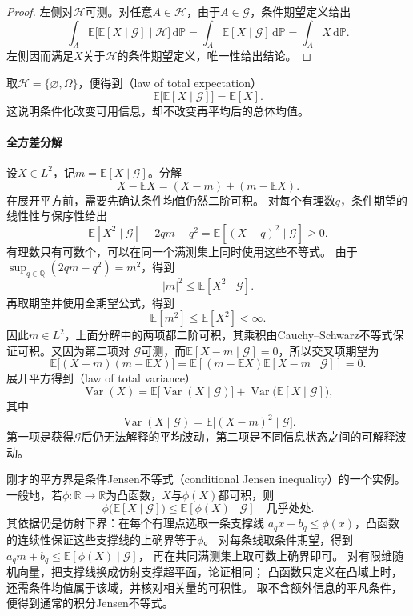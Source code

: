 \begin{proof}
左侧对\(\mathcal{H}\)可测。对任意\(A\in\mathcal{H}\)，由于\(A\in\mathcal{G}\)，条件期望定义给出
\[
  \int_A
  \mathbb{E}\bigl[\mathbb{E}[X\mid\mathcal{G}]
  \mid\mathcal{H}\bigr]\,\mathrm{d}\mathbb{P}
  =
  \int_A\mathbb{E}[X\mid\mathcal{G}]\,\mathrm{d}\mathbb{P}
  =
  \int_A X\,\mathrm{d}\mathbb{P}.
\]
左侧因而满足\(X\)关于\(\mathcal{H}\)的条件期望定义，唯一性给出结论。
\end{proof}

取\(\mathcal{H}=\{\varnothing,\Omega\}\)，便得到（law of total expectation）
\begin{equation}
  \mathbb{E}\bigl[\mathbb{E}[X\mid\mathcal{G}]\bigr]
  =
  \mathbb{E}[X].
  \label{eq:probability-total-expectation}
\end{equation}
这说明条件化改变可用信息，却不改变再平均后的总体均值。

\paragraph{全方差分解}
设\(X\in L^2\)，记\(m=\mathbb{E}[X\mid\mathcal{G}]\)。分解
\[ X-\mathbb{E}X=(X-m)+(m-\mathbb{E}X). \]
在展开平方前，需要先确认条件均值仍然二阶可积。
对每个有理数\(q\)，条件期望的线性性与保序性给出
\[
 \mathbb E[X^2\mid\mathcal G]-2qm+q^2
 =\mathbb E[(X-q)^2\mid\mathcal G]\geq0.
\]
有理数只有可数个，可以在同一个满测集上同时使用这些不等式。
由于\(\sup_{q\in\mathbb Q}(2qm-q^2)=m^2\)，得到
\[
  |m|^2
  \leq
  \mathbb{E}[X^2\mid\mathcal{G}].
\]
再取期望并使用全期望公式，得到
\[
  \mathbb{E}[m^2]\leq\mathbb{E}[X^2]<\infty.
\]
因此\(m\in L^2\)，上面分解中的两项都二阶可积，其乘积由Cauchy--Schwarz不等式保证可积。又因为第二项对
\(\mathcal{G}\)可测，而\(\mathbb{E}[X-m\mid\mathcal{G}]=0\)，所以交叉项期望为
\[ \mathbb{E}\bigl[(X-m)(m-\mathbb{E}X)\bigr]
  =\mathbb{E}\left[(m-\mathbb{E}X)\mathbb{E}[X-m\mid\mathcal{G}]\right]=0. \]
展开平方得到（law of total variance）
\begin{equation}
  \operatorname{Var}(X)
  =
  \mathbb{E}\bigl[\operatorname{Var}(X\mid\mathcal{G})\bigr]
  +
  \operatorname{Var}\bigl(\mathbb{E}[X\mid\mathcal{G}]\bigr),
  \label{eq:probability-total-variance}
\end{equation}
其中
\[ \operatorname{Var}(X\mid\mathcal{G})
  =\mathbb{E}\bigl[(X-m)^2\mid\mathcal{G}\bigr]. \]
第一项是获得\(\mathcal{G}\)后仍无法解释的平均波动，第二项是不同信息状态之间的可解释波动。

刚才的平方界是条件Jensen不等式（conditional Jensen inequality）的一个实例。
一般地，若\(\phi:\mathbb R\to\mathbb R\)为凸函数，\(X\)与\(\phi(X)\)都可积，则
\[
 \phi\bigl(\mathbb E[X\mid\mathcal G]\bigr)
 \leq\mathbb E[\phi(X)\mid\mathcal G]\quad\text{几乎处处}.
\]
其依据仍是仿射下界：在每个有理点选取一条支撑线
\(a_qx+b_q\leq\phi(x)\)，凸函数的连续性保证这些支撑线的上确界等于\(\phi\)。
对每条线取条件期望，得到
\(a_qm+b_q\leq\mathbb E[\phi(X)\mid\mathcal G]\)，
再在共同满测集上取可数上确界即可。
对有限维随机向量，把支撑线换成仿射支撑超平面，论证相同；
凸函数只定义在凸域上时，还需条件均值属于该域，并核对相关量的可积性。
取不含额外信息的平凡条件，便得到通常的积分Jensen不等式。

